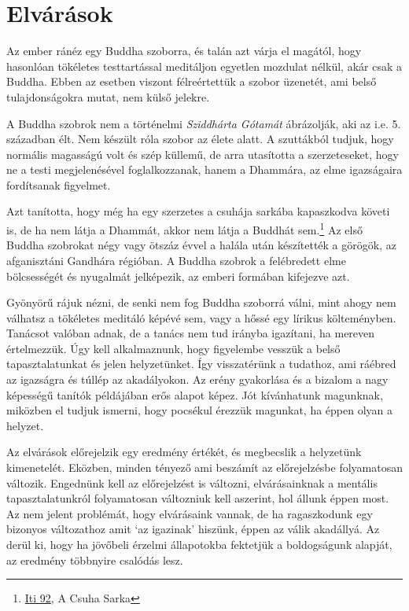 \section{Elvárások}


\noindent Az ember ránéz egy Buddha szoborra, és talán azt várja el
magától, hogy hasonlóan tökéletes testtartással meditáljon egyetlen
mozdulat nélkül, akár csak a Buddha. Ebben az esetben viszont
félreértettük a szobor üzenetét, ami belső tulajdonságokra mutat, nem
külső jelekre.

A Buddha szobrok nem a történelmi \emph{Sziddhárta Gótamát} ábrázolják,
aki az i.e. 5. században élt. Nem készült róla szobor az élete alatt. A
szuttákból tudjuk, hogy normális magasságú volt és szép küllemű, de arra
utasította a szerzeteseket, hogy ne a testi megjelenésével
foglalkozzanak, hanem a Dhammára, az elme igazságaira fordítsanak
figyelmet.

\clearpage

Azt tanította, hogy még ha egy szerzetes a csuhája sarkába kapaszkodva
követi is, de ha nem látja a Dhammát, akkor nem látja a Buddhát
sem.\footnote{\href{https://suttacentral.net/iti92}{Iti 92}, A Csuha
  Sarka} Az első Buddha szobrokat négy vagy ötszáz évvel a halála után
készítették a görögök, az afganisztáni Gandhára régióban. A Buddha
szobrok a felébredett elme bölcsességét és nyugalmát jelképezik, az
emberi formában kifejezve azt.

Gyönyörű rájuk nézni, de senki nem fog Buddha szoborrá válni, mint ahogy
nem válhatsz a tökéletes meditáló képévé sem, vagy a hőssé egy lírikus
költeményben. Tanácsot valóban adnak, de a tanács nem tud irányba
igazítani, ha mereven értelmezzük. Úgy kell alkalmaznunk, hogy
figyelembe vesszük a belső tapasztalatunkat és jelen helyzetünket. Így
visszatérünk a tudathoz, ami ráébred az igazságra és túllép az
akadályokon. Az erény gyakorlása és a bizalom a nagy képességű tanítók
példájában erős alapot képez. Jót kívánhatunk magunknak, miközben el
tudjuk ismerni, hogy pocsékul érezzük magunkat, ha éppen olyan a
helyzet.

Az elvárások előrejelzik egy eredmény értékét, és megbecslik a
helyzetünk kimenetelét. Eközben, minden tényező ami beszámít az
előrejelzésbe folyamatosan változik. Engednünk kell az előrejelzést is
változni, elvárásainknak a mentális tapasztalatunkról folyamatosan
változniuk kell aszerint, hol állunk éppen most. Az nem jelent
problémát, hogy elvárásaink vannak, de ha ragaszkodunk egy bizonyos
változathoz amit `az igazinak' hiszünk, éppen az válik akadállyá. Az
derül ki, hogy ha jövőbeli érzelmi állapotokba fektetjük a boldogságunk
alapját, az eredmény többnyire csalódás lesz.

